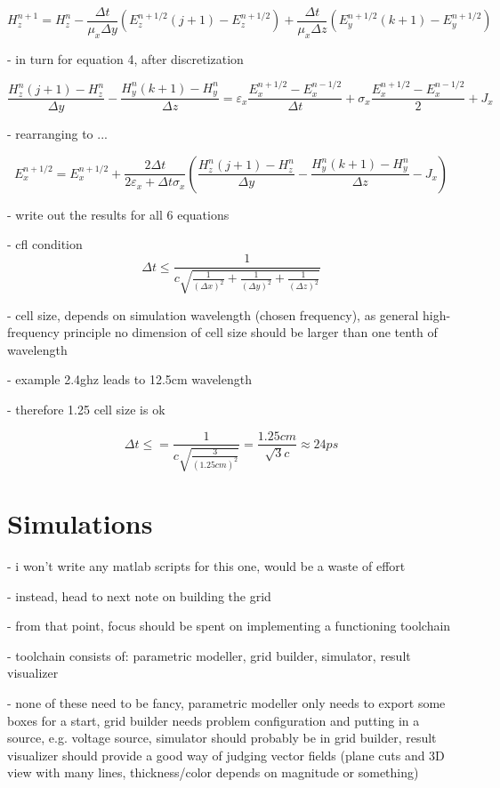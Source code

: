 \documentclass[]{report}
\begin{document}
\begin{equation}
	H_z^{n+1} = H_z^n - \frac{\Delta t}{\mu_x \Delta y}\left( E_z^{n+1/2}(j+1) - E_z^{n+1/2}  \right) + \frac{\Delta t}{\mu_x \Delta z}\left( E_y^{n+1/2}(k+1) - E_y^{n+1/2}  \right)
\end{equation}

- in turn for equation 4, after discretization

\begin{equation}
	\frac{H_z^n(j+1)-H_z^n}{\Delta y} - \frac{H_y^n(k+1)-H_y^n}{\Delta z} = \varepsilon_x \frac{E_x^{n+1/2}-E_x^{n-1/2}}{\Delta t} + \sigma_x \frac{E_x^{n+1/2}-E_x^{n-1/2}}{2} + J_x
\end{equation}

- rearranging to ...

\begin{equation}
	E_x^{n+1/2} = E_x^{n+1/2} + \frac{2\Delta t}{2\varepsilon_x + \Delta t \sigma_x}\left( \frac{H_z^n(j+1) - H_z^n}{\Delta y} - \frac{H_y^n(k+1) - H_y^n}{\Delta z} - J_x \right)
\end{equation}

- write out the results for all 6 equations

- cfl condition
\begin{equation}
	\Delta t \leq \frac{1}{c\sqrt{\frac{1}{(\Delta x)^2} + \frac{1}{(\Delta y)^2} + \frac{1}{(\Delta z)^2}}}
\end{equation}

- cell size, depends on simulation wavelength (chosen frequency), as general high-frequency principle no dimension of cell size should be larger than one tenth of wavelength

- example 2.4ghz leads to 12.5cm wavelength

- therefore 1.25 cell size is ok

\begin{equation}
	\Delta t \leq = \frac{1}{c \sqrt{\frac{3}{(1.25cm)^2}}} = \frac{1.25cm}{\sqrt{3}c} \approx 24ps
\end{equation}

\section{Simulations}

- i won't write any matlab scripts for this one, would be a waste of effort

- instead, head to next note on building the grid

- from that point, focus should be spent on implementing a functioning toolchain

- toolchain consists of: parametric modeller, grid builder, simulator, result visualizer

- none of these need to be fancy, parametric modeller only needs to export some boxes for a start, grid builder needs problem configuration and putting in a source, e.g. voltage source, simulator should probably be in grid builder, result visualizer should provide a good way of judging vector fields (plane cuts and 3D view with many lines, thickness/color depends on magnitude or something)
\end{document}
